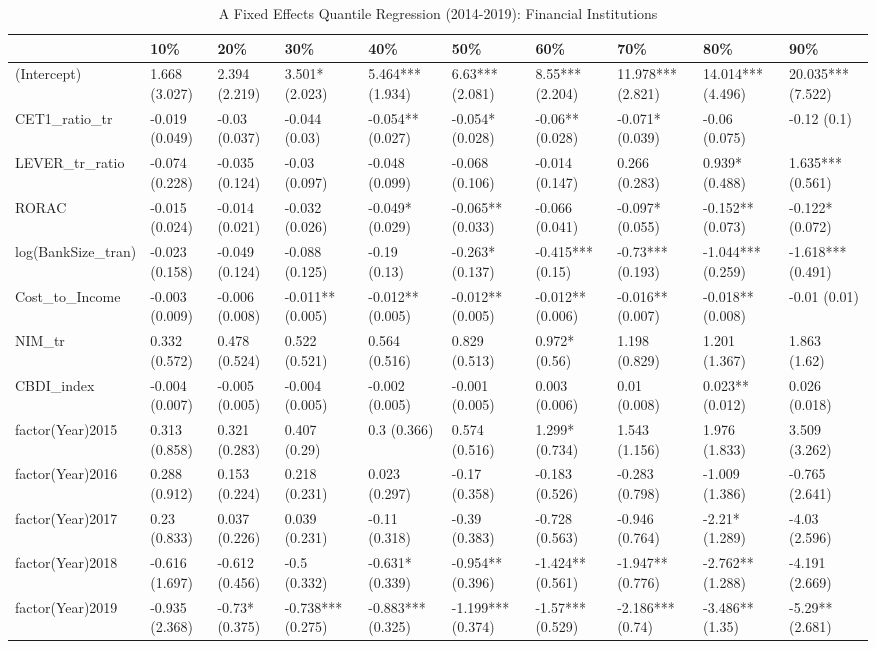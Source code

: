 \begin{table}[ht]
\centering
\caption{A Fixed Effects Quantile Regression (2014-2019): Financial Institutions} 
\begingroup\small
\begin{tabular}{llllllllll}
  \toprule
 & 10\% & 20\% & 30\% & 40\% & 50\% & 60\% & 70\% & 80\% & 90\% \\ 
  \midrule
(Intercept) & 1.668 (3.027) & 2.394 (2.219) & 3.501* (2.023) & 5.464*** (1.934) & 6.63*** (2.081) & 8.55*** (2.204) & 11.978*** (2.821) & 14.014*** (4.496) & 20.035*** (7.522) \\ 
  CET1\_ratio\_tr & -0.019 (0.049) & -0.03 (0.037) & -0.044 (0.03) & -0.054** (0.027) & -0.054* (0.028) & -0.06** (0.028) & -0.071* (0.039) & -0.06 (0.075) & -0.12 (0.1) \\ 
  LEVER\_tr\_ratio & -0.074 (0.228) & -0.035 (0.124) & -0.03 (0.097) & -0.048 (0.099) & -0.068 (0.106) & -0.014 (0.147) & 0.266 (0.283) & 0.939* (0.488) & 1.635*** (0.561) \\ 
  RORAC & -0.015 (0.024) & -0.014 (0.021) & -0.032 (0.026) & -0.049* (0.029) & -0.065** (0.033) & -0.066 (0.041) & -0.097* (0.055) & -0.152** (0.073) & -0.122* (0.072) \\ 
  log(BankSize\_tran) & -0.023 (0.158) & -0.049 (0.124) & -0.088 (0.125) & -0.19 (0.13) & -0.263* (0.137) & -0.415*** (0.15) & -0.73*** (0.193) & -1.044*** (0.259) & -1.618*** (0.491) \\ 
  Cost\_to\_Income & -0.003 (0.009) & -0.006 (0.008) & -0.011** (0.005) & -0.012** (0.005) & -0.012** (0.005) & -0.012** (0.006) & -0.016** (0.007) & -0.018** (0.008) & -0.01 (0.01) \\ 
  NIM\_tr & 0.332 (0.572) & 0.478 (0.524) & 0.522 (0.521) & 0.564 (0.516) & 0.829 (0.513) & 0.972* (0.56) & 1.198 (0.829) & 1.201 (1.367) & 1.863 (1.62) \\ 
  CBDI\_index & -0.004 (0.007) & -0.005 (0.005) & -0.004 (0.005) & -0.002 (0.005) & -0.001 (0.005) & 0.003 (0.006) & 0.01 (0.008) & 0.023** (0.012) & 0.026 (0.018) \\ 
  factor(Year)2015 & 0.313 (0.858) & 0.321 (0.283) & 0.407 (0.29) & 0.3 (0.366) & 0.574 (0.516) & 1.299* (0.734) & 1.543 (1.156) & 1.976 (1.833) & 3.509 (3.262) \\ 
  factor(Year)2016 & 0.288 (0.912) & 0.153 (0.224) & 0.218 (0.231) & 0.023 (0.297) & -0.17 (0.358) & -0.183 (0.526) & -0.283 (0.798) & -1.009 (1.386) & -0.765 (2.641) \\ 
  factor(Year)2017 & 0.23 (0.833) & 0.037 (0.226) & 0.039 (0.231) & -0.11 (0.318) & -0.39 (0.383) & -0.728 (0.563) & -0.946 (0.764) & -2.21* (1.289) & -4.03 (2.596) \\ 
  factor(Year)2018 & -0.616 (1.697) & -0.612 (0.456) & -0.5 (0.332) & -0.631* (0.339) & -0.954** (0.396) & -1.424** (0.561) & -1.947** (0.776) & -2.762** (1.288) & -4.191 (2.669) \\ 
  factor(Year)2019 & -0.935 (2.368) & -0.73* (0.375) & -0.738*** (0.275) & -0.883*** (0.325) & -1.199*** (0.374) & -1.57*** (0.529) & -2.186*** (0.74) & -3.486** (1.35) & -5.29** (2.681) \\ 
   \bottomrule
\end{tabular}
\endgroup
\end{table}
